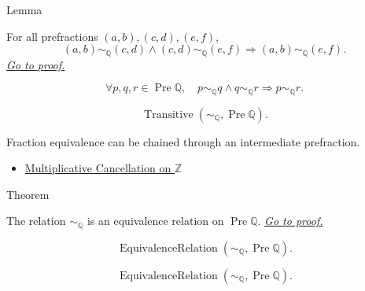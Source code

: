 \begin{lemmabox}{Lemma}
\begin{lemma}
\label{lem:fraction-equivalence-transitive}
For all prefractions $(a,b),(c,d),(e,f)$,
\[
(a,b)\sim_{\mathbb{Q}}(c,d)\land
(c,d)\sim_{\mathbb{Q}}(e,f)
\Longrightarrow
(a,b)\sim_{\mathbb{Q}}(e,f).
\]
\hyperref[prf:fraction-equivalence-transitive]{\textit{Go to proof.}}
\end{lemma}
\end{lemmabox}

\begin{remark*}
\[
\forall p,q,r\in\operatorname{Pre}\mathbb{Q},\quad
p\sim_{\mathbb{Q}}q\land q\sim_{\mathbb{Q}}r
\Longrightarrow p\sim_{\mathbb{Q}}r.
\]
\end{remark*}

\begin{remark*}
\[
\operatorname{Transitive}(\sim_{\mathbb{Q}},\operatorname{Pre}\mathbb{Q}).
\]
\end{remark*}

\begin{remark*}[Interpretation]
Fraction equivalence can be chained through an intermediate prefraction.
\end{remark*}

\begin{dependencies}
\begin{itemize}
  \item \hyperref[cor:multiplicative-cancellation-on-z]{Multiplicative Cancellation on $\mathbb{Z}$}
\end{itemize}
\end{dependencies}

\begin{theorembox}{Theorem}
\begin{theorem}
\label{thm:fraction-equivalence-relation}
The relation $\sim_{\mathbb{Q}}$ is an equivalence relation on
$\operatorname{Pre}\mathbb{Q}$.
\hyperref[prf:fraction-equivalence-relation]{\textit{Go to proof.}}
\end{theorem}
\end{theorembox}

\begin{remark*}
\[
\operatorname{EquivalenceRelation}(\sim_{\mathbb{Q}},\operatorname{Pre}\mathbb{Q}).
\]
\end{remark*}

\begin{remark*}
\[
\operatorname{EquivalenceRelation}(\sim_{\mathbb{Q}},\operatorname{Pre}\mathbb{Q}).
\]
\end{remark*}

